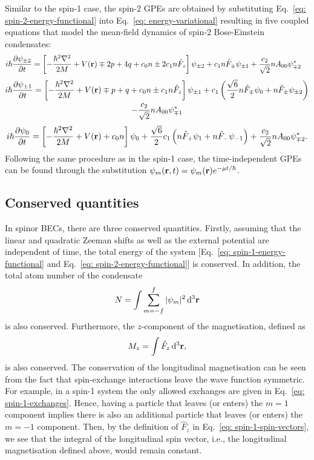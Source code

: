 Similar to the spin-1 case, the spin-2 GPEs are obtained by substituting
Eq.~\eqref{eq: spin-2-energy-functional} into Eq.~\eqref{eq: energy-variational}
resulting in five coupled equations that model the mean-field dynamics of spin-2
Bose-Einstein condensates:
\begin{align}\label{eq: spin-2-GPEs-pm2}   
    i\hbar\pdv{\psi_{\pm 2}}{t} &= \left[-\frac{\hbar^2\nabla^2}{2M}
        + V(\vb{r}) \mp 2p + 4q + c_0n \pm 2c_1n\hat{F}_z\right]\psi_{\pm 2}
    + c_1n\hat{F}_{\mp}\psi_{\pm 1} + \frac{c_2}{\sqrt{2}}nA_{00}\psi_{\mp 2}^*
\end{align}
\begin{multline}\label{eq: spin-2-GPEs-pm1}
    i\hbar\pdv{\psi_{\pm 1}}{t} = \left[-\frac{\hbar^2\nabla^2}{2M}
    + V(\vb{r}) \mp p + q + c_0n \pm c_1n\hat{F}_z\right]\psi_{\pm 1}
    + c_1\left(\frac{\sqrt{6}}{2}n\hat{F}_{\mp}\psi_0
    + n\hat{F}_{\pm}\psi_{\pm 2}\right) \\
    - \frac{c_2}{\sqrt{2}}nA_{00}\psi_{\mp 1}^* 
\end{multline}
\begin{align}\label{eq: spin-2-GPEs-0}
    i\hbar\pdv{\psi_0}{t} = \left[-\frac{\hbar^2\nabla^2}{2M}
    + V(\vb{r}) + c_0n\right]\psi_0
    + \frac{\sqrt{6}}{2}c_1\left(n\hat{F}_+\psi_1 + n\hat{F}_-\psi_{-1}\right)
    + \frac{c_2}{\sqrt{2}}nA_{00}\psi_{\mp 2}^*.
\end{align}
Following the same procedure as in the spin-1 case, the time-independent GPEs
can be found through the substitution \(\psi_m(\vb{r}, t) = \psi_m(\vb{r})
e^{-\mu t/\hbar}\).

\subsection{Conserved quantities}\label{subsec: conserved-quantities}
In spinor BECs, there are three conserved quantities.
Firstly, assuming that the linear and quadratic Zeeman shifts as well as the
external potential are independent of time, the total energy of the system
[Eq.~\eqref{eq: spin-1-energy-functional} and
Eq.~\eqref{eq: spin-2-energy-functional}] is conserved.
In addition, the total atom number of the condensate
\begin{align}
    N = \int \sum_{m=-f}^f |\psi_m|^2 \, \dd^3\vb{r}
\end{align}
is also conserved.
Furthermore, the \(z\)-component of the magnetisation, defined as
\begin{align}\label{eq: magnetisation-formula}
    M_z = \int \hat{F}_z \, \dd^3\vb{r},
\end{align}
is also conserved.
The conservation of the longitudinal magnetisation can be seen from the fact
that spin-exchange interactions leave the wave function symmetric.
For example, in a spin-1 system the only allowed exchanges are given in
Eq.~\eqref{eq: spin-1-exchanges}.
Hence, having a particle that leaves (or enters) the \(m=1\) component implies
there is also an additional particle that leaves (or enters) the \(m=-1\)
component.
Then, by the definition of \(\hat{F}_z\) in Eq.~\eqref{eq: spin-1-spin-vectors},
we see that the integral of the longitudinal spin vector, i.e., the longitudinal
magnetisation defined above, would remain constant.

